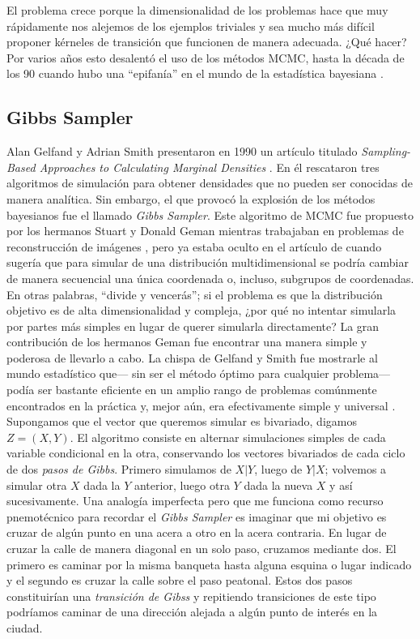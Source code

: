 El problema crece porque la dimensionalidad de los problemas hace que muy rápidamente nos alejemos de los ejemplos triviales y sea mucho más difícil proponer kérneles de transición que funcionen de manera adecuada. ¿Qué hacer? Por varios años esto desalentó el uso de los métodos MCMC, hasta la década de los 90 cuando hubo una ``epifanía'' en el mundo de la estadística bayesiana \parencite{RobertCasella11}. 

\subsection{Gibbs Sampler}

Alan Gelfand y Adrian Smith presentaron en 1990 un artículo titulado \textit{Sampling-Based Approaches to Calculating Marginal Densities} \parencite{GelfandSmith90}. En él rescataron tres algoritmos de simulación para obtener densidades que no pueden ser conocidas de manera analítica. Sin embargo, el que provocó la explosión de los métodos bayesianos fue el llamado \textit{Gibbs Sampler}. Este algoritmo de MCMC fue propuesto por los hermanos Stuart y Donald Geman mientras trabajaban en problemas de reconstrucción de imágenes \textcite{GemanGeman84}, pero ya estaba oculto en el artículo de \textcite{Hastings70} cuando sugería que para simular de una distribución multidimensional se podría cambiar de manera secuencial una única coordenada o, incluso, subgrupos de coordenadas.\\ 

En otras palabras, ``divide y vencerás''; si el problema es que la distribución objetivo es de alta dimensionalidad y compleja, ¿por qué no intentar simularla por partes más simples en lugar de querer simularla directamente? La gran contribución de los hermanos Geman fue encontrar una manera simple y poderosa de llevarlo a cabo. La chispa de Gelfand y Smith fue mostrarle al mundo estadístico que--- sin ser el método óptimo para cualquier problema--- podía ser bastante eficiente en un amplio rango de problemas comúnmente encontrados en la práctica y, mejor aún, era efectivamente simple y universal \parencite{GelfandEtAl90}.\\

Supongamos que el vector que queremos simular es bivariado, digamos $Z = (X,Y)$. El algoritmo consiste en alternar simulaciones simples de cada variable condicional en la otra, conservando los vectores bivariados de cada ciclo de dos \textit{pasos de Gibbs}. Primero simulamos de $X|Y$, luego de $Y|X$; volvemos a simular otra $X$ dada la $Y$ anterior, luego otra $Y$ dada la nueva $X$ y así sucesivamente. Una analogía imperfecta pero que me funciona como recurso pnemotécnico para recordar el \textit{Gibbs Sampler} es imaginar que mi objetivo es cruzar de algún punto en una acera a otro en la acera contraria. En lugar de cruzar la calle de manera diagonal en un solo paso, cruzamos mediante dos. El primero es caminar por la misma banqueta hasta alguna esquina o lugar indicado y el segundo es cruzar la calle sobre el paso peatonal. Estos dos pasos constituirían una \textit{transición de Gibss} y repitiendo transiciones de este tipo podríamos caminar de una dirección alejada a algún punto de interés en la ciudad.\\ 


